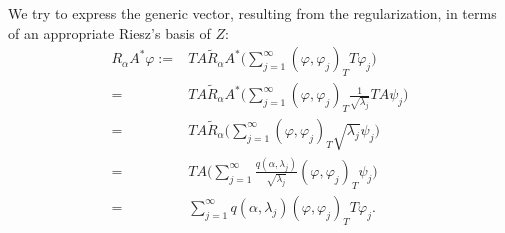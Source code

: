 \documentclass[10pt, a4paper, twoside, openright]{book}
\theoremstyle{definition}
\theoremstyle{plain}
\theoremstyle{plain}
\theoremstyle{plain}
\theoremstyle{plain}
\theoremstyle{plain}
\theoremstyle{plain}
\theoremstyle{plain}
\theoremstyle{plain}
\let\phi\varphi
\begin{document}
\begin{center}
\end{center}
We try to express the generic vector, resulting from the regularization, in terms of an appropriate Riesz's basis of $Z$:
\begin{align}
  R_\alpha A^*\phi :=& TA\tilde{R}_\alpha A^*\Big(\sum_{j=1}^\infty(\phi,\phi_j)_TT\phi_j\Big) \\
  =& TA\tilde{R}_\alpha A^*\Big(\sum_{j=1}^\infty(\phi,\phi_j)_T\frac{1}{\sqrt{\lambda_j}}TA\psi_j\Big) \\
  =& TA\tilde{R}_\alpha \Big(\sum_{j=1}^\infty(\phi,\phi_j)_T\sqrt{\lambda_j}\psi_j\Big) \\
  =& TA\Big(\sum_{j=1}^\infty\frac{q(\alpha,\lambda_j)}{\sqrt{\lambda_j}}(\phi,\phi_j)_T\psi_j\Big) \\
  =&\sum_{j=1}^\infty q(\alpha,\lambda_j)(\phi,\phi_j)_TT\phi_j.
\end{align}
\end{document}
